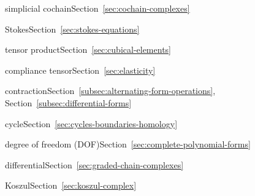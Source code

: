 \par\noindent\hspace*{1em}\label{index:complex-simplicial-cochain}{simplicial cochain}\quad Section~\ref{sec:cochain-complexes}

\par\noindent\hspace*{1em}\label{index:complex-stokes}{Stokes}\quad Section~\ref{sec:stokes-equations}

\par\noindent\hspace*{1em}\label{index:complex-tensor-product}{tensor product}\quad Section~\ref{sec:cubical-elements}

\par\noindent\hspace*{0em}\label{index:compliance-tensor}{compliance tensor}\quad Section~\ref{sec:elasticity}

\par\noindent\hspace*{0em}\label{index:contraction}{contraction}\quad Section~\ref{subsec:alternating-form-operations}, Section~\ref{subsec:differential-forms}

\par\noindent\hspace*{0em}\label{index:cycle}{cycle}\quad Section~\ref{sec:cycles-boundaries-homology}

\par\noindent\hspace*{0em}\label{index:degree-of-freedom-dof}{degree of freedom (DOF)}\quad Section~\ref{sec:complete-polynomial-forms}

\par\noindent\hspace*{0em}\label{index:differential}{differential}\quad Section~\ref{sec:graded-chain-complexes}

\par\noindent\hspace*{1em}\label{index:differential-koszul}{Koszul}\quad Section~\ref{sec:koszul-complex}

